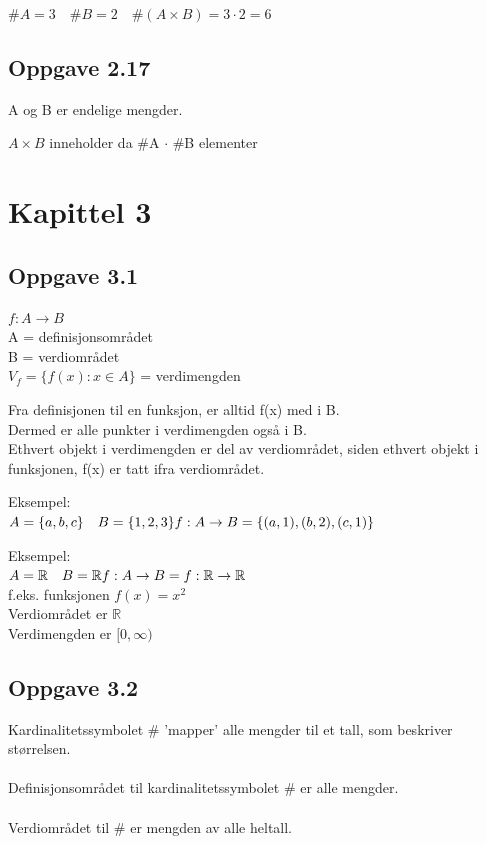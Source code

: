 \documentclass{article}
\begin{document}
\(\#A = 3\quad \#B = 2 \quad \#(A\times B) = 3 \cdot 2 = 6\)

\subsection*{Oppgave 2.17}

A og B er endelige mengder.

\(A \times B\) inneholder da \#A $\cdot$ \#B elementer

\section*{Kapittel 3}

\subsection*{Oppgave 3.1}

\(f : A \rightarrow B\) \\
A = definisjonsområdet \\
B = verdiområdet \\

\(V_f = \{ f(x) : x \in A \} \) = verdimengden

Fra definisjonen til en funksjon, er alltid f(x) med i B.
\\ Dermed er alle punkter i verdimengden også i B.
\\ Ethvert objekt i verdimengden er del av verdiområdet, siden ethvert objekt i funksjonen, f(x) er tatt ifra verdiområdet.

Eksempel: \\
\( A = \{a, b, c\} \quad B = \{1, 2, 3\} \\ f : A \rightarrow B = \{(a, 1), (b, 2), (c, 1)\}\)

Eksempel: \\
\(A = \mathbb{R} \quad B = \mathbb{R} \\ f : A \rightarrow B = f : \mathbb{R} \rightarrow \mathbb{R}\) \\ 
f.eks. funksjonen $f(x) = x^2$ \\
Verdiområdet er $\mathbb{R}$ \\
Verdimengden er \([0, \infty)\)

\subsection*{Oppgave 3.2}
Kardinalitetssymbolet \# 'mapper' alle mengder til et tall, som beskriver størrelsen. \\ \\
Definisjonsområdet til kardinalitetssymbolet \# er alle mengder. \\ \\
Verdiområdet til \# er mengden av alle heltall. \\ \\
\end{document}
